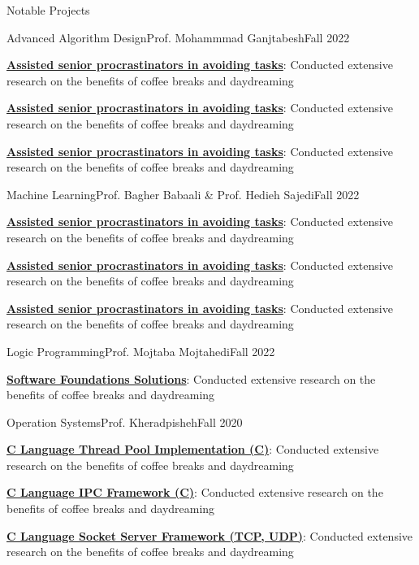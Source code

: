 \documentclass[]{main}
\begin{document}
\begin{section}{Notable Projects}
 \begin{subsection}{Advanced Algorithm Design}{Prof. Mohammmad Ganjtabesh}{Fall 2022}{}
     \item \textbf{\href{https://google.com}{Assisted senior procrastinators in avoiding tasks}}: Conducted extensive research on the benefits of coffee breaks and daydreaming
     \item \textbf{\href{https://google.com}{Assisted senior procrastinators in avoiding tasks}}: Conducted extensive research on the benefits of coffee breaks and daydreaming
     \item \textbf{\href{https://google.com}{Assisted senior procrastinators in avoiding tasks}}: Conducted extensive research on the benefits of coffee breaks and daydreaming
 \end{subsection}

 \begin{subsection}{Machine Learning}{Prof. Bagher Babaali \& Prof. Hedieh Sajedi}{Fall 2022}{}
     \item \textbf{\href{https://google.com}{Assisted senior procrastinators in avoiding tasks}}: Conducted extensive research on the benefits of coffee breaks and daydreaming
     \item \textbf{\href{https://google.com}{Assisted senior procrastinators in avoiding tasks}}: Conducted extensive research on the benefits of coffee breaks and daydreaming
     \item \textbf{\href{https://google.com}{Assisted senior procrastinators in avoiding tasks}}: Conducted extensive research on the benefits of coffee breaks and daydreaming
 \end{subsection}

 \begin{subsection}{Logic Programming}{Prof. Mojtaba Mojtahedi}{Fall 2022}{}
     \item \textbf{\href{https://github.com/ckoliber/sfexercises}{Software Foundations Solutions}}: Conducted extensive research on the benefits of coffee breaks and daydreaming
 \end{subsection}

 \begin{subsection}{Operation Systems}{Prof. Kheradpisheh}{Fall 2020}{}
     \item \textbf{\href{https://github.com/ckoliber/Kprocessor}{C Language Thread Pool Implementation (C)}}: Conducted extensive research on the benefits of coffee breaks and daydreaming
     \item \textbf{\href{https://github.com/ckoliber/Kipc}{C Language IPC Framework (C)}}: Conducted extensive research on the benefits of coffee breaks and daydreaming
     \item \textbf{\href{https://github.com/ckoliber/Knet}{C Language Socket Server Framework (TCP, UDP)}}: Conducted extensive research on the benefits of coffee breaks and daydreaming
 \end{subsection}


\end{section}
\end{document}
